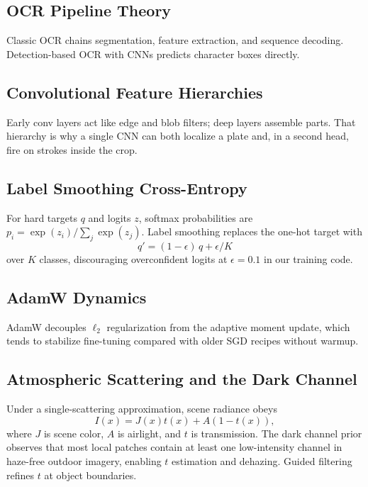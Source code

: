 \documentclass[10pt, conference]{IEEEtran}
\begin{document}
\subsection{OCR Pipeline Theory}
Classic OCR chains segmentation, feature extraction, and sequence decoding. Detection-based OCR with CNNs predicts character boxes directly.

\subsection{Convolutional Feature Hierarchies}
Early conv layers act like edge and blob filters; deep layers assemble parts. That hierarchy is why a single CNN can both localize a plate and, in a second head, fire on strokes inside the crop.

\subsection{Label Smoothing Cross-Entropy}
For hard targets $q$ and logits $z$, softmax probabilities are $p_i=\exp(z_i)/\sum_j\exp(z_j)$. Label smoothing replaces the one-hot target with
\begin{equation}
q'=(1-\epsilon)\,q+\epsilon/K
\label{eq:labelsmooth}
\end{equation}
over $K$ classes, discouraging overconfident logits at $\epsilon{=}0.1$ in our training code.

\subsection{AdamW Dynamics}
AdamW decouples $\ell_2$ regularization from the adaptive moment update, which tends to stabilize fine-tuning compared with older SGD recipes without warmup.

\subsection{Atmospheric Scattering and the Dark Channel}
Under a single-scattering approximation, scene radiance obeys
\begin{equation}
I(x)=J(x)t(x)+A(1-t(x)),
\label{eq:scatter}
\end{equation}
where $J$ is scene color, $A$ is airlight, and $t$ is transmission. The dark channel prior observes that most local patches contain at least one low-intensity channel in haze-free outdoor imagery, enabling $t$ estimation and dehazing. Guided filtering refines $t$ at object boundaries.
\end{document}
